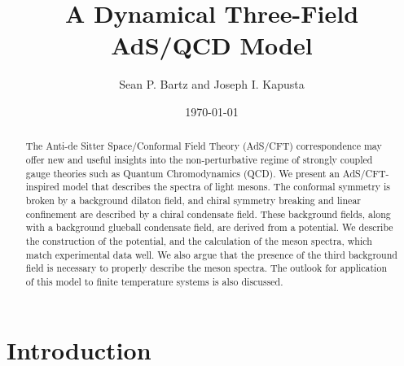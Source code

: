 \documentclass[aps,prd,12pt,nofootinbib]{revtex4}
\begin{document}
\title{{\bf A Dynamical Three-Field AdS/QCD Model}}
\author{Sean P. Bartz and Joseph I. Kapusta}


\vspace{.3cm}
\date{\today}

\parindent=20pt




\begin{abstract}
The Anti-de Sitter Space/Conformal Field Theory (AdS/CFT) correspondence may offer new and useful insights into the non-perturbative regime of strongly coupled gauge theories such as Quantum Chromodynamics (QCD). 
We present an AdS/CFT-inspired model that describes the spectra of light mesons. 
The conformal symmetry is broken by a background dilaton field, and chiral symmetry breaking and linear confinement are described by a chiral condensate field. 
These background fields, along with a background glueball condensate field, are derived from a potential. 
We describe the construction of the potential, and the calculation of the meson spectra, which match experimental data well. 
We also argue that the presence of the third background field is necessary to properly describe the meson spectra. 
The outlook for application of this model to finite temperature systems is also discussed.
\end{abstract}

\maketitle
\vfill

\section{Introduction}
\end{document}
